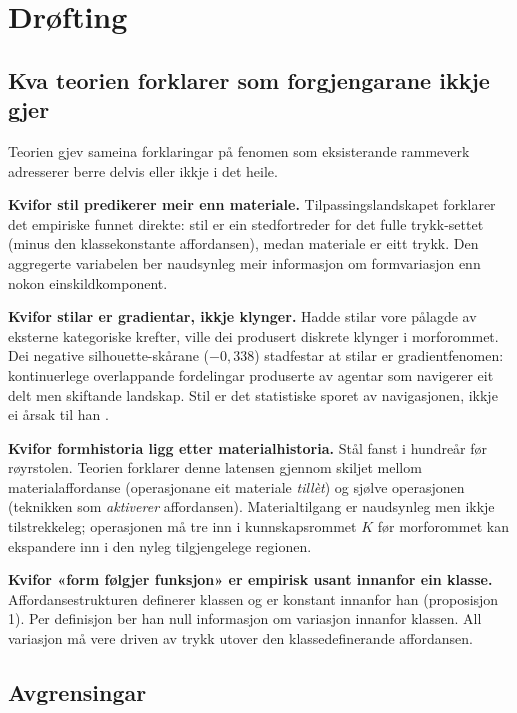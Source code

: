 \section{Drøfting}
\label{sec:discussion-nn}

\subsection{Kva teorien forklarer som forgjengarane ikkje gjer}

Teorien gjev sameina forklaringar på fenomen som eksisterande rammeverk adresserer berre delvis eller ikkje i det heile.

\textbf{Kvifor stil predikerer meir enn materiale.} Tilpassingslandskapet forklarer det empiriske funnet direkte: stil er ein stedfortreder for det fulle trykk-settet (minus den klassekonstante affordansen), medan materiale er eitt trykk. Den aggregerte variabelen ber naudsynleg meir informasjon om formvariasjon enn nokon einskildkomponent.

\textbf{Kvifor stilar er gradientar, ikkje klynger.} Hadde stilar vore pålagde av eksterne kategoriske krefter, ville dei produsert diskrete klynger i morforommet. Dei negative silhouette-skårane ($-0{,}338$) stadfestar at stilar er gradientfenomen: kontinuerlege overlappande fordelingar produserte av agentar som navigerer eit delt men skiftande landskap. Stil er det statistiske sporet av navigasjonen, ikkje ei årsak til han \parencite{Kubler1962}.

\textbf{Kvifor formhistoria ligg etter materialhistoria.} Stål fanst i hundreår før røyrstolen. Teorien forklarer denne latensen gjennom skiljet mellom materialaffordanse (operasjonane eit materiale \textit{tillèt}) og sjølve operasjonen (teknikken som \textit{aktiverer} affordansen). Materialtilgang er naudsynleg men ikkje tilstrekkeleg; operasjonen må tre inn i kunnskapsrommet $K$ før morforommet kan ekspandere inn i den nyleg tilgjengelege regionen.

\textbf{Kvifor «form følgjer funksjon» er empirisk usant innanfor ein klasse.} Affordansestrukturen definerer klassen og er konstant innanfor han (proposisjon 1). Per definisjon ber han null informasjon om variasjon innanfor klassen. All variasjon må vere driven av trykk utover den klassedefinerande affordansen.

\subsection{Avgrensingar}

